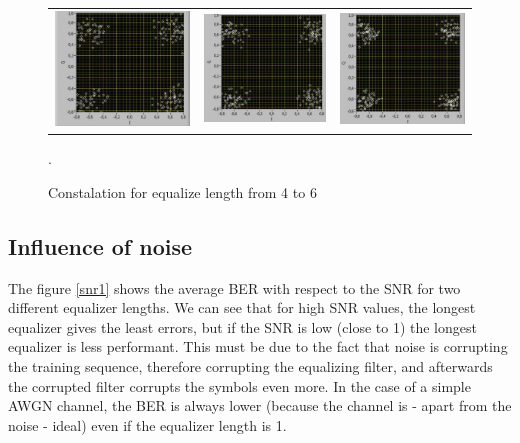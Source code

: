 \documentclass{article}
\begin{document}
    \begin{figure}[h]
        \centering
        \begin{tabular}{ccc}
            \includegraphics[width= 0.3 \textwidth]{eq4.png} & \includegraphics[width= 0.3 \textwidth]{eq5.png} & \includegraphics[width= 0.3 \textwidth]{eq6.png} \\
        \end{tabular}
        \caption{Constalation for equalize length from 4 to 6 \label{4-6}}.
    \end{figure}
    
    \subsection{Influence of noise}
    The figure \ref{snr1} shows the average BER with respect to the SNR for two different equalizer lengths. We can see that for high SNR values, the longest equalizer gives the least errors, but if the SNR is low (close to 1) the longest equalizer is less performant. This must be due to the fact that noise is corrupting the training sequence, therefore corrupting the equalizing filter, and afterwards the corrupted filter corrupts the symbols even more. In the case of a simple AWGN channel, the BER is always lower (because the channel is - apart from the noise - ideal) even if the equalizer length is 1.
    
\end{document}
